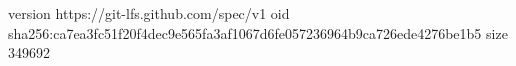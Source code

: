 version https://git-lfs.github.com/spec/v1
oid sha256:ca7ea3fc51f20f4dec9e565fa3af1067d6fe057236964b9ca726ede4276be1b5
size 349692
